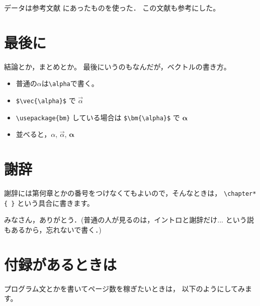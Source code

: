 \documentclass[a4paper, 12pt]{jsreport}
\begin{document}
  データは参考文献\cite{rika} にあったものを使った． この文献\cite{ten}も参考にした。


  \chapter{最後に}


  結論とか，まとめとか。 最後にいうのもなんだが，ベクトルの書き方。
  \begin{itemize}
    \item 普通の$\alpha$は\verb|\alpha|で書く。

    \item \verb|$\vec{\alpha}$| で $\vec{\alpha}$

    \item \verb|\usepackage{bm}| している場合は \verb|$\bm{\alpha}$| で $\bm{\alpha}$

    \item 並べると，$\alpha$, $\vec{\alpha}$, $\bm{\alpha}$
  \end{itemize}

  \chapter*{謝辞}


  謝辞には第何章とかの番号をつけなくてもよいので，そんなときは， \verb|\chapter*{ }|
  という具合に書きます。

  みなさん，ありがとう．(普通の人が見るのは，イントロと謝辞だけ... という説もあるから，忘れないで書く．)

  \appendix
  \chapter{付録があるときは}
  プログラム文とかを書いてページ数を稼ぎたいときは， 以下のようにしてみます。
\end{document}
